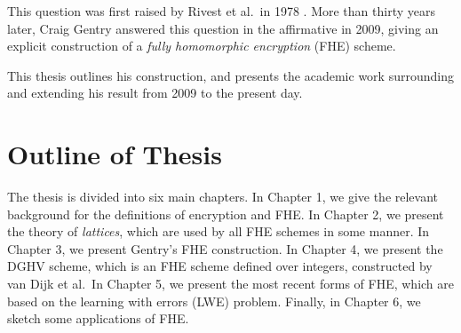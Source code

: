 This question was first raised by Rivest et al.~in 1978 \cite{rivest1978data}. More than thirty years later, Craig Gentry answered this question in the affirmative in 2009, giving an explicit construction of a \emph{fully homomorphic encryption} (FHE) scheme.

This thesis outlines his construction, and presents the academic work surrounding and extending his result from 2009 to the present day.


\section*{Outline of Thesis}
The thesis is divided into six main chapters. In Chapter 1, we give the relevant background for the definitions of encryption and FHE. In Chapter 2, we present the theory of \emph{lattices}, which are used by all FHE schemes in some manner. In Chapter 3, we present Gentry's FHE construction. In Chapter 4, we present the DGHV scheme, which is an FHE scheme defined over integers, constructed by van Dijk et al.~In Chapter 5, we present the most recent forms of FHE, which are based on the learning with errors (LWE) problem. Finally, in Chapter 6, we sketch some applications of FHE.
